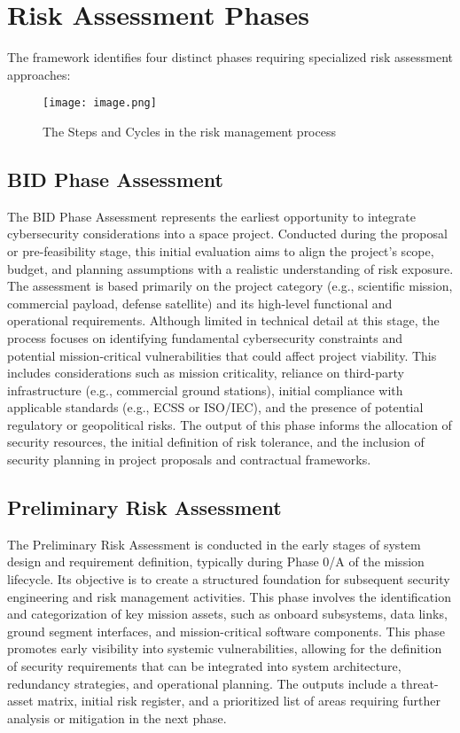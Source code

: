 \documentclass[binding=0.6cm]{sapthesis}
\begin{document}
\section{Risk Assessment Phases}

The framework identifies four distinct phases requiring specialized risk assessment approaches:
\begin{figure}
    \centering
    \texttt{[image: image.png]}
    \caption{The Steps and Cycles in the risk management process}
    \label{fig:enter-label}
\end{figure}

\subsection{BID Phase Assessment}
The BID Phase Assessment represents the earliest opportunity to integrate cybersecurity considerations into a space project. Conducted during the proposal or pre-feasibility stage, this initial evaluation aims to align the project’s scope, budget, and planning assumptions with a realistic understanding of risk exposure. The assessment is based primarily on the project category (e.g., scientific mission, commercial payload, defense satellite) and its high-level functional and operational requirements. Although limited in technical detail at this stage, the process focuses on identifying fundamental cybersecurity constraints and potential mission-critical vulnerabilities that could affect project viability. This includes considerations such as mission criticality, reliance on third-party infrastructure (e.g., commercial ground stations), initial compliance with applicable standards (e.g., ECSS or ISO/IEC), and the presence of potential regulatory or geopolitical risks. The output of this phase informs the allocation of security resources, the initial definition of risk tolerance, and the inclusion of security planning in project proposals and contractual frameworks.

\subsection{Preliminary Risk Assessment}
The Preliminary Risk Assessment is conducted in the early stages of system design and requirement definition, typically during Phase 0/A of the mission lifecycle. Its objective is to create a structured foundation for subsequent security engineering and risk management activities. This phase involves the identification and categorization of key mission assets, such as onboard subsystems, data links, ground segment interfaces, and mission-critical software components. This phase promotes early visibility into systemic vulnerabilities, allowing for the definition of security requirements that can be integrated into system architecture, redundancy strategies, and operational planning. The outputs include a threat-asset matrix, initial risk register, and a prioritized list of areas requiring further analysis or mitigation in the next phase.
\end{document}
